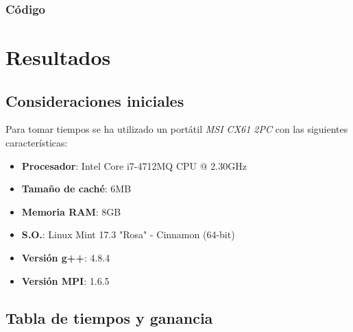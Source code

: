 \subsubsection{Código}



\section{Resultados}

\subsection{Consideraciones iniciales}

Para tomar tiempos se ha utilizado un portátil \textit{MSI CX61 2PC} con las siguientes características:
\begin{itemize}
	\item \textbf{Procesador}: Intel\textregistered{} Core\texttrademark{} i7-4712MQ CPU @ 2.30GHz
	\item \textbf{Tamaño de caché}: 6MB
	\item \textbf{Memoria RAM}: 8GB
	\item \textbf{S.O.}: Linux Mint 17.3 "Rosa" - Cinnamon (64-bit)
	\item \textbf{Versión g++}: 4.8.4
	\item \textbf{Versión MPI}: 1.6.5
\end{itemize}

\subsection{Tabla de tiempos y ganancia}

